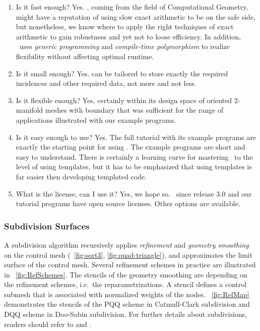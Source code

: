 \documentclass[twocolumn]{article}
\begin{document}
\begin{enumerate}
  \item
    Is it fast enough? Yes. \cgal, coming from the field of Computational
    Geometry, might have a reputation of using slow exact arithmetic
    to be on the safe side, but nonetheless, we know where to apply
    the right techniques of exact arithmetic to gain robustness and
    yet not to loose efficiency. In addition, \cgal\ uses
    \emph{generic programming\/} and \emph{compile-time
    polymorphism\/} to realize flexibility without affecting optimal
    runtime.
  \item
    Is it small enough? Yes.  can be
    tailored to store exactly the required incidences and other
    required data, not more and not less.
  \item
    Is it flexible enough? Yes, certainly within its design
    space of oriented 2-manifold meshes with boundary that was
    sufficient for the range of applications illustrated with our
    example programs. 
  \item
    Is it easy enough to use? Yes. The full tutorial with its example
    programs are exactly the starting point for using \cgalpoly. The
    example programs are short and easy to understand. There is
    certainly a learning curve for mastering \CC\ to the level
    of using templates, but it has to be emphasized that
    using templates is far easier then developing templated code.
  \item
    What is the license, can I use it? Yes, we hope so. \cgal\ since
    release 3.0 and our tutorial programs have open source
    licenses. Other options are available.
\end{enumerate}


\subsubsection*{Subdivision Surfaces}

A subdivision algorithm recursively 
applies \emph{refinement} and \emph{geometry smoothing} 
on the control mesh (\figurename\ \ref{fig:sqrt3},  
\ref{fig:quad-triangle}), 
and approximates the limit surface of the control mesh.  Several
refinement schemes in practice are illustrated in
\figurename\ \ref{fig:RefSchemes}. The stencils of the
geometry smoothing are depending on the refinement schemes, 
i.e.\ the reparametrizations. A stencil defines a control
submesh that is associated with normalized weights of the 
nodes. \figurename\ \ref{fig:RefMap} 
demonstrates the stencils of the PQQ scheme  
in Catmull-Clark subdivision and DQQ scheme in Doo-Sabin
subdivision. For further details about subdivisions, readers
should refer to \cite{Warren:subdivision} and \cite{Sub:course:2000}.
   
\end{document}
